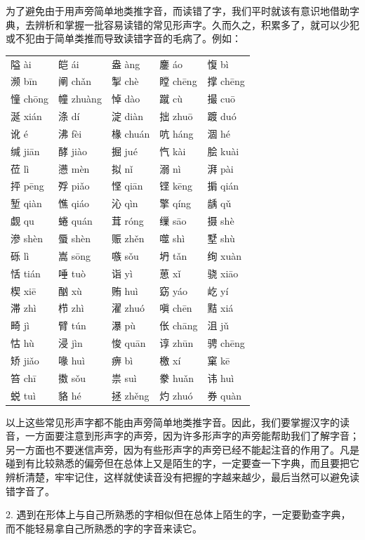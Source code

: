 为了避免由于用声旁简单地类推字音，而读错了字，我们平时就该有意识地借助字典，去辨析和掌握一批容易读错的常见形声字。久而久之，积累多了，就可以少犯或不犯由于简单类推而导致读错字音的毛病了。例如：
\noindent
\begin{tabular}{lllll}
隘 ài & 皑 ái & 盎 àng & 鏖 áo & 愎 bì \\
濒 bīn & 阐 chǎn & 掣 chè & 瞠 chēng & 撑 chēng\\
憧 chōng & 幢 zhuàng & 悼 dào & 蹴 cù & 撮 cuō\\
涎 xián & 涤 dí & 淀 diàn & 拙 zhuō & 踱 duó\\
讹 é & 沸 fèi & 椽 chuán & 吭 háng & 涸 hé\\
缄 jiān & 酵 jiào & 掘 jué & 忾 kài & 脍 kuài\\
莅 lì & 懑 mèn & 拟 nǐ & 溺 nì & 湃 pài\\
抨 pēng & 殍 piǎo & 悭 qiān & 铿 kēng & 掮 qián\\
堑 qiàn & 憔 qiáo & 沁 qìn & 擎 qíng & 龋 qǔ\\
觑 qu & 蜷 quán & 茸 róng & 缫 sāo & 摄 shè\\
滲 shèn & 蜃 shèn & 赈 zhěn & 噬 shì & 墅 shù\\
砾 lì & 嵩 sōng & 嗾 sǒu & 坍 tǎn & 绚 xuàn\\
恬 tián & 唾 tuò & 诣 yì & 葸 xǐ & 骁 xiāo\\
楔 xiē & 酗 xù & 贿 huì & 窈 yáo & 屹 yí\\
滞 zhì & 栉 zhì & 濯 zhuó & 嗔 chēn & 黠 xiá\\
畸 jì & 臂 tún & 瀑 pù & 伥 chāng & 沮 jǔ\\
怙 hù & 浸 jìn & 悛 quān & 谆 zhūn & 骋 chēng\\
矫 jiǎo & 喙 huì & 痹 bì & 檄 xí & 窠 kē\\
笞 chī & 擞 sǒu & 祟 suì & 豢 huǎn & 讳 huì\\
蜕 tuì & 貉 hé & 拯 zhěng & 灼 zhuó & 券 quàn\\
\end{tabular}

\vspace{1em}
以上这些常见形声字都不能由声旁简单地类推字音。因此，我们要掌握汉字的读音，一方面要注意到形声字的声旁，因为许多形声字的声旁能帮助我们了解字音；另一方面也不要迷信声旁，因为有些形声字的声旁已经不能起注音的作用了。凡是碰到有比较熟悉的偏旁但在总体上又是陌生的字，一定要查一下字典，而且要把它辨析清楚，牢牢记住，这样就使读音没有把握的字越来越少，最后当然可以避免读错字音了。

2. 遇到在形体上与自己所熟悉的字相似但在总体上陌生的字，一定要勤查字典，而不能轻易拿自己所熟悉的字的字音来读它。

